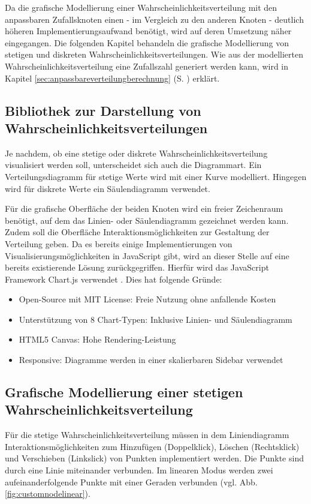 Da die grafische Modellierung einer Wahrscheinlichkeitsverteilung mit den anpassbaren Zufallsknoten einen - im Vergleich zu den anderen Knoten - deutlich höheren Implementierungsaufwand benötigt, wird auf deren Umsetzung näher eingegangen. Die folgenden Kapitel behandeln die grafische Modellierung von stetigen und diskreten Wahrscheinlichkeitsverteilungen. Wie aus der modellierten Wahrscheinlichkeitsverteilung eine Zufallszahl generiert werden kann, wird in Kapitel \ref{sec:anpassbareverteilungberechnung} (S. \pageref{sec:anpassbareverteilungberechnung}) erklärt.

\subsection{Bibliothek zur Darstellung von Wahrscheinlichkeitsverteilungen}

Je nachdem, ob eine stetige oder diskrete Wahrscheinlichkeitsverteilung visualisiert werden soll, unterscheidet sich auch die Diagrammart. Ein Verteilungsdiagramm für stetige Werte wird mit einer Kurve modelliert. Hingegen wird für diskrete Werte ein Säulendiagramm verwendet. 

Für die grafische Oberfläche der beiden Knoten wird ein freier Zeichenraum benötigt, auf dem das Linien- oder Säulendiagramm gezeichnet werden kann. Zudem soll die Oberfläche Interaktionsmöglichkeiten zur Gestaltung der Verteilung geben. Da es bereits einige Implementierungen von Visualisierungsmöglichkeiten in JavaScript gibt, wird an dieser Stelle auf eine bereits existierende Lösung zurückgegriffen. Hierfür wird das JavaScript Framework Chart.js verwendet \cite{chartjs}. Dies hat folgende Gründe:
\begin{itemize}
    \item Open-Source mit MIT License: Freie Nutzung ohne anfallende Kosten
    \item Unterstützung von 8 Chart-Typen: Inklusive Linien- und Säulendiagramm
    \item HTML5 Canvas: Hohe Rendering-Leistung
    \item Responsive: Diagramme werden in einer skalierbaren Sidebar verwendet
\end{itemize}

\subsection{Grafische Modellierung einer stetigen Wahrscheinlichkeitsverteilung}

Für die stetige Wahrscheinlichkeitsverteilung müssen in dem Liniendiagramm Interaktionsmöglichkeiten zum Hinzufügen (Doppelklick), Löschen (Rechtsklick) und Verschieben (Linkslick) von Punkten implementiert werden. Die Punkte sind durch eine Linie miteinander verbunden. Im linearen Modus werden zwei aufeinanderfolgende Punkte mit einer Geraden verbunden (vgl. Abb. \ref{fig:customnodelinear}).

